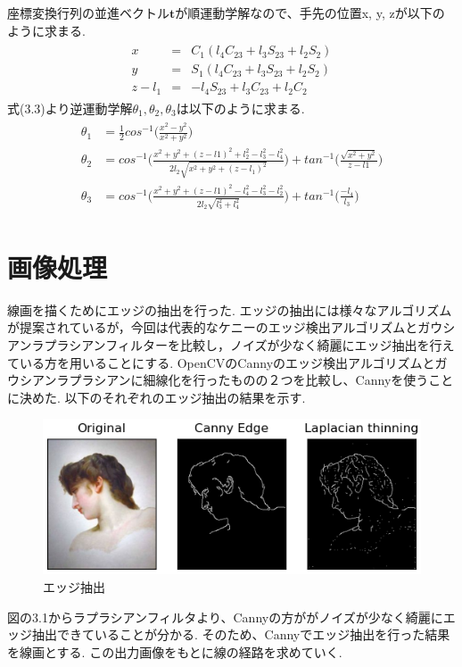 	座標変換行列の並進ベクトル$\boldsymbol{t}$が順運動学解なので、手先の位置x, y, zが以下のように求まる.
	\begin{equation}
			\begin{array}{c}
			\begin{split}
				x &=& C_1(l_4C_{23} + l_3S_{23} + l_2S_2) \\
				y &=& S_1(l_4C_{23} + l_3S_{23} + l_2S_2) \\
				z - l_1 &=& -l_4S_{23} + l_3C_{23} + l_2C_2
			\end{split}
		\end{array}
	\end{equation}
	式(3.3)より逆運動学解$\theta_1, \theta_2, \theta_3$は以下のように求まる.
	\begin{equation}
			\begin{array}{c}
			\begin{split}
				\theta_1  &  =\frac{1}{2}  cos^{-1}\biggl( \frac{x^2-y^2}{x^2+y^2} \biggr) \\
				\theta_2 & = cos^{-1}\biggl( \frac{x^2+y^2+(z-l1)^2 + l_2^2-l_3^2-l_4^2}{2l_2\sqrt{x^2+y^2+(z-l_1)^2}} \biggr) + tan^{-1}\biggl( \frac{\sqrt{x^2+y^2}}{z-l1}\biggr) \\
				\theta_3 & =cos^{-1}\biggl( \frac{x^2+y^2+(z-l1)^2 - l_4^2-l_3^2-l_2^2}{2l_2\sqrt{l_3^2+l_4^2}}\biggr) + tan^{-1}\biggl( \frac{-l_4}{l_3}\biggr)
			\end{split}
			\end{array}
	\end{equation}
	\section{画像処理}
	線画を描くためにエッジの抽出を行った. エッジの抽出には様々なアルゴリズムが提案されているが，今回は代表的なケニーのエッジ検出アルゴリズムとガウシアンラプラシアンフィルターを比較し，ノイズが少なく綺麗にエッジ抽出を行えている方を用いることにする. 
	OpenCVのCannyのエッジ検出アルゴリズムとガウシアンラプラシアンに細線化を行ったものの２つを比較し、Cannyを使うことに決めた. 以下のそれぞれのエッジ抽出の結果を示す. 
	 \begin{center}
        \begin{figure}[h]
            \includegraphics[width=1.0\textwidth]{./img/001.png}
            \caption{エッジ抽出}
            \label{manipulator}
        \end{figure}
    \end{center}
	図の3.1からラプラシアンフィルタより、Cannyの方ががノイズが少なく綺麗にエッジ抽出できていることが分かる. そのため、Cannyでエッジ抽出を行った結果を線画とする. この出力画像をもとに線の経路を求めていく.
